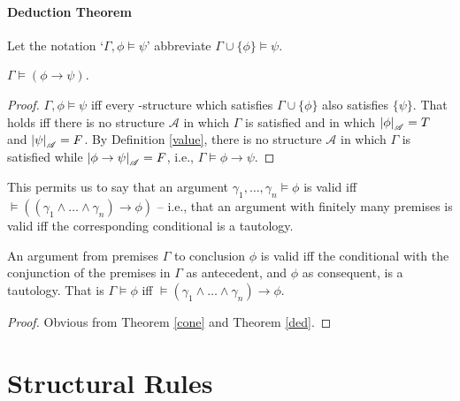 \paragraph{Deduction Theorem}
	Let the notation `$\Gamma,\phi \vDash \psi$' abbreviate $\Gamma \cup\{\phi\} \vDash \psi$.\begin{theorem}[Deduction]\label{ded} $\Gamma \vDash (\phi \to \psi)$. 
\begin{proof}
$\Gamma, \phi \vDash \psi$ iff  every \lone-structure which satisfies $\Gamma\cup\{\phi\}$ also satisfies $\{\psi\}$. That holds iff there is no structure $\mathscr{A}$ in which $\Gamma$ is satisfied and in which $\left|\phi\right|_{\mathscr{A}}=T$ and $\left|\psi\right|_{\mathscr{A}}=F$. By Definition \ref{value}, there is no structure $\mathscr{A}$ in which $\Gamma$ is satisfied while $\left|\phi\to\psi\right|_{\mathscr{A}}=F$, i.e., $\Gamma\vDash\phi\to\psi$.
\end{proof}
\end{theorem}
This permits us to say that an argument $\gamma_{1},\ldots,\gamma_{n} \vDash \phi$ is valid iff $\vDash ((\gamma_{1} \wedge \ldots \wedge \gamma_{n})\to \phi)$ – i.e., that an argument with finitely many premises is valid iff the corresponding conditional is a tautology.\begin{corol}
	An argument from premises $\Gamma$ to conclusion $\phi$ is valid iff the conditional with the conjunction of the premises in $\Gamma$ as antecedent, and $\phi$ as consequent, is a tautology. That is $\Gamma\vDash\phi$ iff $\vDash (\gamma_{1}\wedge\ldots\wedge\gamma_{n}) \to \phi$. \begin{proof}
		Obvious from Theorem \ref{cone} and Theorem \ref{ded}.
	\end{proof}
\end{corol}




\section{Structural Rules}\label{twostruct}

